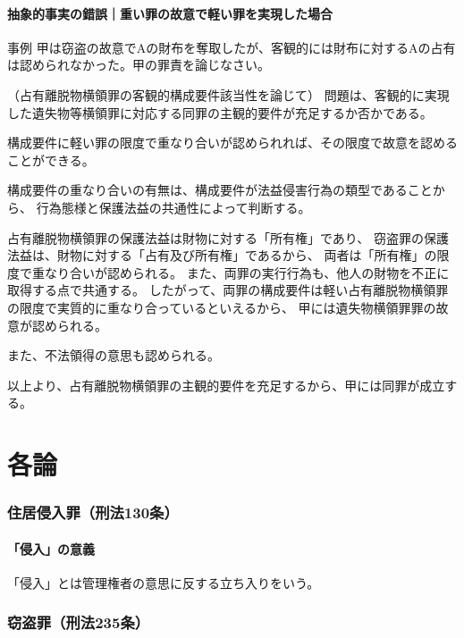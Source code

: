 \documentclass[11pt]{jsarticle}
\begin{document}
		\subsection{抽象的事実の錯誤｜重い罪の故意で軽い罪を実現した場合}
			\begin{itembox}[l]{事例}
				甲は窃盗の故意でAの財布を奪取したが、客観的には財布に対するAの占有は認められなかった。甲の罪責を論じなさい。
			\end{itembox}
			
			（占有離脱物横領罪の客観的構成要件該当性を論じて）
			問題は、客観的に実現した遺失物等横領罪に対応する同罪の主観的要件が充足するか否かである。
			
			構成要件に軽い罪の限度で重なり合いが認められれば、その限度で故意を認めることができる。
			
			構成要件の重なり合いの有無は、構成要件が法益侵害行為の類型であることから、
			行為態様と保護法益の共通性によって判断する。
			
			占有離脱物横領罪の保護法益は財物に対する「所有権」であり、
			窃盗罪の保護法益は、財物に対する「占有及び所有権」であるから、
			両者は「所有権」の限度で重なり合いが認められる。
			また、両罪の実行行為も、他人の財物を不正に取得する点で共通する。
			したがって、両罪の構成要件は軽い占有離脱物横領罪の限度で実質的に重なり合っているといえるから、
			甲には遺失物横領罪罪の故意が認められる。
			
			また、不法領得の意思も認められる。
			
			以上より、占有離脱物横領罪の主観的要件を充足するから、甲には同罪が成立する。
			
		
	
		
		
	

\part{各論}
	\section{住居侵入罪（刑法130条）}
		\subsection{「侵入」の意義}
			「侵入」とは管理権者の意思に反する立ち入りをいう。
		
	\section{窃盗罪（刑法235条）}
\end{document}
